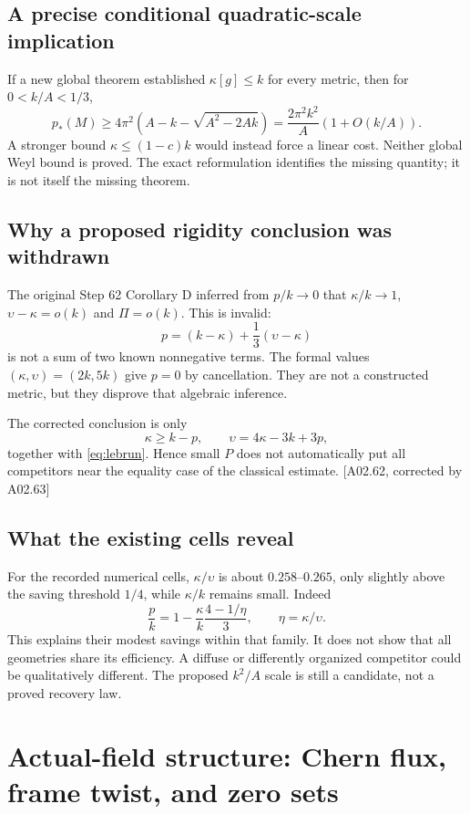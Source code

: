 \documentclass[11pt]{article}
\newcommand{\sref}[1]{\textsf{[#1]}}
\theoremstyle{remark}
\begin{document}
\subsection{A precise conditional quadratic-scale implication}
If a new global theorem established $\kappa[g]\le k$ for every metric,
then for $0<k/A<1/3$,
\begin{equation}
 p_*(M)\ge4\pi^2\left(A-k-\sqrt{A^2-2Ak}\right)
 =\frac{2\pi^2k^2}{A}\left(1+O(k/A)\right).\label{eq:quadratic}
\end{equation}
A stronger bound $\kappa\le(1-c)k$ would instead force a linear cost.
Neither global Weyl bound is proved. The exact reformulation identifies the
missing quantity; it is not itself the missing theorem.

\subsection{Why a proposed rigidity conclusion was withdrawn}
The original Step 62 Corollary D inferred from $p/k\to0$ that
$\kappa/k\to1$, $\upsilon-\kappa=o(k)$ and $\Pi=o(k)$. This is invalid:
\[
 p=(k-\kappa)+\frac13(\upsilon-\kappa)
\]
is not a sum of two known nonnegative terms. The formal values
$(\kappa,\upsilon)=(2k,5k)$ give $p=0$ by cancellation. They are not a
constructed metric, but they disprove that algebraic inference.

The corrected conclusion is only
\[
 \kappa\ge k-p,\qquad \upsilon=4\kappa-3k+3p,
\]
together with \eqref{eq:lebrun}. Hence small $P$ does not automatically put
all competitors near the equality case of the classical estimate.
\sref{A02.62, corrected by A02.63}

\subsection{What the existing cells reveal}
For the recorded numerical cells, $\kappa/\upsilon$ is about $0.258$--$0.265$,
only slightly above the saving threshold $1/4$, while $\kappa/k$ remains
small. Indeed
\[
 \frac pk=1-\frac\kappa k\frac{4-1/\eta}{3},\qquad
 \eta=\kappa/\upsilon.
\]
This explains their modest savings within that family. It does not show that
all geometries share its efficiency. A diffuse or differently organized
competitor could be qualitatively different. The proposed $k^2/A$ scale is
still a candidate, not a proved recovery law.

\section{Actual-field structure: Chern flux, frame twist, and zero sets}
\end{document}
